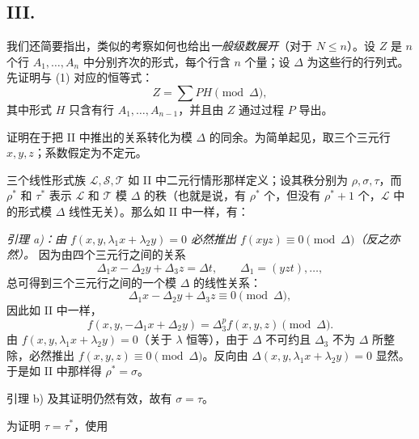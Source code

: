 \subsection*{III.}
我们还简要指出，类似的考察如何也给出\emph{一般级数展开}（对于 $N\le n$）。设 $Z$ 是 $n$ 个行 $A_1,\ldots,A_n$ 中分别齐次的形式，每个行含 $n$ 个量；设 $\Delta$ 为这些行的行列式。先证明与 (1) 对应的恒等式：
\begin{equation}
  Z=\sum PH \pmod{\Delta},
\tag{2}
\end{equation}
其中形式 $H$ 只含有行 $A_1,\ldots,A_{n-1}$，并且由 $Z$ 通过过程 $P$ 导出。

证明在于把 II 中推出的关系转化为模 $\Delta$ 的同余。为简单起见，取三个三元行 $x,y,z$；系数假定为不定元。

三个线性形式族 $\mathcal L,\mathcal S,\mathcal T$ 如 II 中二元行情形那样定义；设其秩分别为 $\rho,\sigma,\tau$，而 $\rho^*$ 和 $\tau^*$ 表示 $\mathcal L$ 和 $\mathcal T$ 模 $\Delta$ 的秩（也就是说，有 $\rho^*$ 个，但没有 $\rho^*+1$ 个，$\mathcal L$ 中的形式模 $\Delta$ 线性无关）。那么如 II 中一样，有：

\emph{引理 a)：由 $f(x,y,\lambda_1x+\lambda_2y)=0$ 必然推出 $f(xyz)\equiv0\pmod{\Delta}$（反之亦然）。} 因为由四个三元行之间的关系
\[
  \Delta_1x-\Delta_2y+\Delta_3z=\Delta t,
  \qquad \Delta_1=(yzt),\ldots,
\]
总可得到三个三元行之间的一个模 $\Delta$ 的线性关系：
\[
  \Delta_1x-\Delta_2y+\Delta_3z\equiv0\pmod{\Delta},
\]
因此如 II 中一样，
\[
  f(x,y,-\Delta_1x+\Delta_2y)=\Delta_3^p f(x,y,z)\pmod{\Delta}.
\]
由 $f(x,y,\lambda_1x+\lambda_2y)=0$（关于 $\lambda$ 恒等），由于 $\Delta$ 不可约且 $\Delta_3$ 不为 $\Delta$ 所整除，必然推出 $f(x,y,z)\equiv0\pmod{\Delta}$。反向由 $\Delta(x,y,\lambda_1x+\lambda_2y)=0$ 显然。于是如 II 中那样得 $\rho^*=\sigma$。

引理 b) 及其证明仍然有效，故有 $\sigma=\tau$。

为证明 $\tau=\tau^*$，使用


